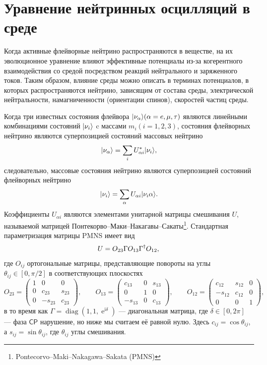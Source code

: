 \documentclass[a4paper,12pt]{article}
\newcommand{\diag}{\operatorname{diag}}
\renewcommand{\exp}{\operatorname{e}}
\renewcommand{\imath}{\mathrm{i}}
\DeclarePairedDelimiter\ket{|}{\rangle}
\begin{document}
	\newpage
	\section{Уравнение нейтринных осцилляций в среде}
	Когда активные флейворные нейтрино распространяются в веществе, на их
	эволюционное уравнение влияют эффективные потенциалы из-за когерентного
	взаимодействия со средой посредством реакций нейтрального и заряженного
	токов. Таким образом, влияние среды можно описать в терминах потенциалов, в
	которых распространяются нейтрино, зависящим от состава среды, электрической
	нейтральности, намагниченности (ориентации спинов), скоростей частиц среды.

	Когда три известных состояния флейвора \(\ket{\nu_{\alpha}} (\alpha= e, \mu, \tau)\) являются линейными комбинациями состояний \(\ket{\nu_{i}}\) c массами \(m_{i} (i=1,2,3)\), состояния флейворных нейтрино являются суперпозицией состояний
	массовых нейтрино
	\begin{equation}\label{eq:11}
		\ket{\nu_{\alpha}}=\sum_{i}U_{\alpha i}^{*}\ket{\nu_{i}},
	\end{equation}
	следовательно, массовые состояния нейтрино являются суперпозицией состояний флейворных нейтрино
	\begin{equation}\label{eq:11a}
		\ket{\nu_{i}}=\sum_{\alpha}U_{\alpha i}\ket{\nu_{i}{\alpha}}.
	\end{equation}
	Коэффициенты \(U_{\alpha i}\) являются элементами унитарной матрицы
	смешивания \(U\), называемой матрицей
	Понтекорво--Маки--Накагавы--Сакаты\footnote{Pontecorvo--Maki--Nakagawa--Sakata
	(PMNS)}. Стандартная параметризация матрицы PMNS имеет вид
	\begin{equation}
		U=O_{23}\Gamma O_{13}\Gamma^{\dagger}O_{12},\\
	\end{equation}
	где \(O_{ij}\) ортогональные матрицы, представляющие повороты на углы \(\theta_{ij}\in[0, \pi/2]\) в соответствующих плоскостях
	\begin{equation}
  		O_{23}=
  		\begin{pmatrix}
  			1 & 0 & 0\\
  			0 & c_{23} & s_{23}\\
  			0 & -s_{23} & c_{23}
  		\end{pmatrix},
		\qquad O_{13}=
  		\begin{pmatrix}
  			c_{13} & 0 & s_{13}\\
  			0 & 1 & 0\\
  			-s_{13} &0 & c_{13}
  		\end{pmatrix},
		\qquad O_{12}=
  		\begin{pmatrix}
  			c_{12} & s_{12} & 0\\
  			-s_{12} & c_{12} & 0\\
  			0 & 0 & 1
  		\end{pmatrix},
	\end{equation}
	 в то время как \(\Gamma=\diag(1,1,\exp^{\imath\delta})\) --- диагональная матрица, где
	\(\delta\in[0, 2\pi]\) --- фаза \(\mathsf{CP}\) нарушение, но ниже мы считаем
	её равной нулю. Здесь \(c_{ij}=\cos\theta_{ij}\), а \(s_{ij}=\sin\theta_{ij}\), где \(\theta_{ij}\) углы смешивания.
\end{document}
